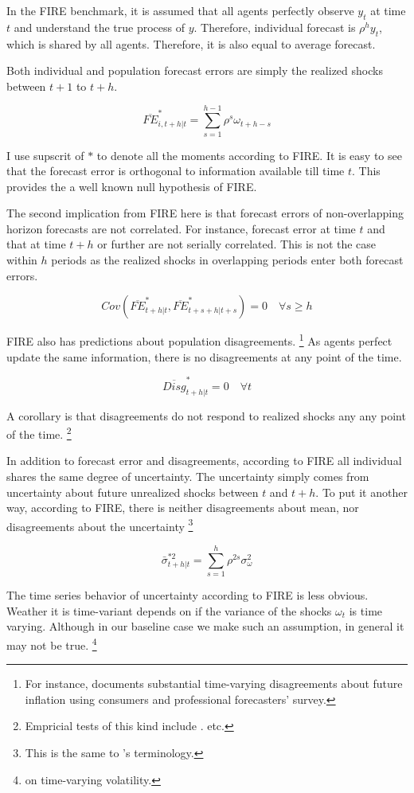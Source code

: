 \documentclass[]{article}
\begin{document}
 In the FIRE benchmark,  it is assumed that all agents perfectly observe $y_t$ at time $t$ and understand the true process of $y$. Therefore, individual forecast is $\rho^h y_t $, which is shared by all agents. Therefore, it is also equal to average forecast. 

Both individual and population forecast errors are simply the realized shocks between $t+1$ to $t+h$.  

$$\overline{FE}^{*}_{i,t+h|t} = \sum^{h-1}_{s=1} \rho^s \omega_{t+h-s}$$ 


I use supscrit of $*$ to denote all the moments according to FIRE. It is easy to see that the forecast error is orthogonal to information available till time $t$. This provides the a well known null hypothesis of FIRE. \cite{xx}

The second implication from FIRE here is that forecast errors of non-overlapping horizon forecasts are not correlated. For instance, forecast error at time $t$ and that at time $t+h$ or further are not serially correlated. This is not the case within $h$ periods as the realized shocks in overlapping periods enter both forecast errors. 

$$Cov(\overline{FE}^{*}_{t+h|t}, \overline{FE}^{*}_{t+s+h|t+s}) = 0 \quad \forall s \geq h$$

FIRE also has predictions about  population disagreements. \footnote{For instance, \cite{mankiw2003disagreement} documents substantial time-varying disagreements about future inflation using consumers and professional forecasters' survey. } As agents perfect update the same information, there is no disagreements at any point of the time. 

$$\overline{Disg}^{*}_{t+h|t}=0 \quad \forall t$$

A corollary is that disagreements do not respond to realized shocks any any point of the time.  \footnote{Empricial tests of this kind include \cite{xx}.\cite{xx} etc. }

In addition to forecast error and disagreements, according to FIRE all individual shares the same degree of uncertainty. The uncertainty simply comes from uncertainty about future unrealized shocks between $t$ and $t+h$. To put it another way, according to FIRE, there is neither disagreements about mean, nor disagreements about the uncertainty \footnote{This is the same to \cite{}'s terminology.} 

$$\bar \sigma^{*2}_{t+h|t} = \sum^{h}_{s=1}\rho^{2s} \sigma^2_{\omega}$$

The time series behavior of uncertainty according to FIRE is less obvious. Weather it is time-variant depends on if the variance of the shocks $\omega_t$ is time varying. Although in our baseline case we make such an assumption, in general it may not be true. \footnote{\cite{xx} on time-varying volatility.}
\end{document}
